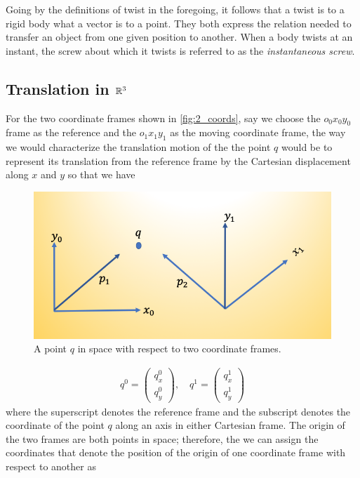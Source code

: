 Going by the definitions of twist in the foregoing, it follows that a twist is to a rigid body what a vector is to a point. They both express the relation needed to transfer an object from one given position to another. When a body twists at an instant, the screw about which it twists is referred to as the \textit{instantaneous screw}.

\subsection{Translation in $\mathbb{R}^3$}

%
For the two coordinate frames shown in  \autoref{fig:2_coords}, say we choose the $o_0x_0 y_0$ frame as the reference and the $o_1x_1y_1$ as the moving coordinate frame, the way we would characterize the translation motion of the the point $q$ would be to represent its translation from the reference frame by the Cartesian displacement along $x$ and $y$ so that we have 
\begin{figure}
	\centering
	\includegraphics[width=.8\columnwidth]{figures/trans_coords.png}
	\caption{A point $q$ in space with respect to two coordinate frames.}
	\label{fig:2_coords}
\end{figure}
%
\begin{align}
q^0 = \left( \begin{array}{c}
q^0_x \\ q_y^0
\end{array}
\right), \quad
%
q^1 = \left( \begin{array}{c}
q^1_x \\ q_y^1
\end{array}
\right)
\end{align}
%
where the superscript denotes the reference frame and the subscript denotes the coordinate of the point $q$ along an axis in either Cartesian frame. The origin of the two frames are both points in space; therefore, the we can assign the coordinates that denote the position of the origin of one coordinate frame with respect to another as 
